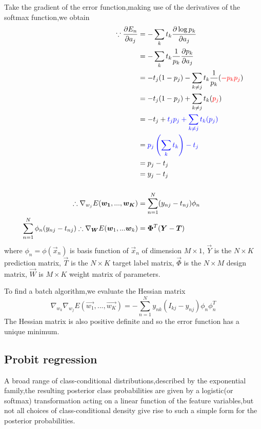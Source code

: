 Take the gradient of the error function,making use of the derivatives of the softmax function,we obtain
\begin{align}
\because
\frac{\partial E_n}{\partial a_j}
&=-\sum_kt_k\frac{\partial \log p_k}{\partial a_j}\\
&=-\sum_kt_k\frac{1}{p_k}\frac{\partial p_k}{\partial a_j}\\
&=-t_j(1-p_j)-\sum_{k\neq j}t_k\frac{1}{p_k}({\color{red}{-p_kp_j}})\\
&=-t_j(1-p_j)+\sum_{k\neq j}t_k({\color{red}{p_j}})\\
&=-t_j+\color{blue}{t_jp_j+\sum_{k\neq j}t_k({p_j})}\\
&=\color{blue}{p_j\left(\sum_kt_k\right)}-t_j \\
&=p_j-t_j \\
&=y_j-t_j \\
\\
\therefore
\nabla_{w_j}E(\vec{w_1},...,\vec{w_K}) &= \sum_{n=1}^{N}(y_{nj}-t_{nj})\phi_n \\
\sum_{n=1}^{N}\phi_n(y_{nj}-t_{nj})
\therefore
\nabla_{\vec{W}}E(\vec{w}_1,...\vec{w}_k) &= \vec{\Phi}^T(\vec{Y}-\vec{T})
\end{align}
where $\phi_n = \phi(\vec{x}_n)$ is basis function of $\vec{x}_n$ of dimension $M \times 1$, $\vec{Y}$ is the $N\times K$ prediction matrix, $\vec{T}$ is the $N\times K$ target label matrix, $\vec{\Phi}$ is the $N\times M$ design matrix, $\vec{W}$ is $M \times K$ weight matrix of parameters.
\begin{equation}
\end{equation}

To find a batch algorithm,we evaluate the Hessian matrix
\begin{equation}
\nabla_{w_k}\nabla_{w_j}E(\vec{w_1},...,\vec{w_K})
=-\sum_{n=1}^{N}y_{nk}(I_{kj}-y_{nj})\phi_n\phi_n^T
\end{equation}
The Hessian matrix is also positive definite and so the error function has a unique minimum.

\subsection{Probit regression}
A broad range of class-conditional distributions,described by the exponential family,the resulting posterior class probabilities are given by a logistic(or softmax) transformation acting on a linear function of the feature variables,but not all choices of class-conditional density give rise to such a simple form for the posterior probabilities.


